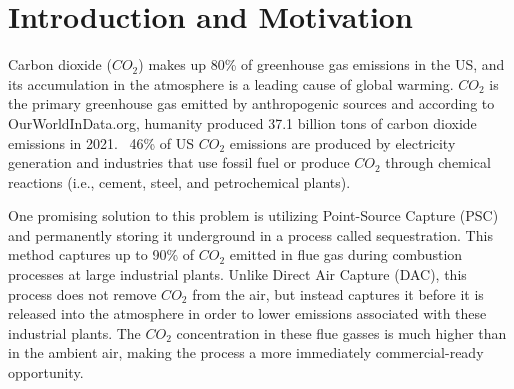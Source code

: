 \documentclass[balance,upint,subscriptcorrection,varvw,mathalfa=cal=boondoxo,spanish,french,vietnamese,russian,greek,pdf-a,colorlinks]{asmeconf}
\begin{document}






\section{Introduction and Motivation}
Carbon dioxide ($CO_{2}$) makes up 80\% of greenhouse gas emissions in the US, and its accumulation in the atmosphere is a leading cause of global warming. $CO_{2}$ is the primary greenhouse gas emitted by anthropogenic sources and according to OurWorldInData.org, humanity produced 37.1 billion tons of carbon dioxide emissions in 2021. ~46\% of US $CO_{2}$ emissions are produced by electricity generation and industries that use fossil fuel or produce $CO_{2}$ through chemical reactions (i.e., cement, steel, and petrochemical plants). \cite{EPA_2017}

One promising solution to this problem is utilizing Point-Source Capture (PSC) and permanently storing it underground in a process called sequestration. This method captures up to 90\% of $CO_{2}$ emitted in flue gas during combustion processes at large industrial plants. Unlike Direct Air Capture (DAC), this process does not remove $CO_{2}$ from the air, but instead captures it before it is released into the atmosphere in order to lower emissions associated with these industrial plants. The $CO_{2}$ concentration in these flue gasses is much higher than in the ambient air, making the process a more immediately commercial-ready opportunity. \cite{IRA2022}
\end{document}
